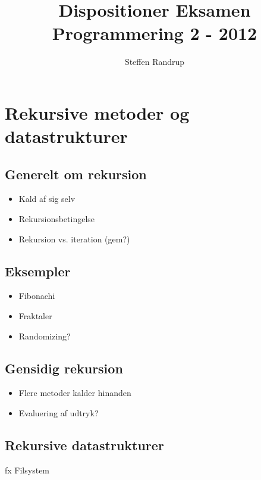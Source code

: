 
\author{Steffen Randrup}
\title{Dispositioner Eksamen Programmering 2 - 2012}

\maketitle
\newpage
\section{Rekursive metoder og datastrukturer} %
\label{sec:rekursive_metoder_og_datastrukturer}
\subsection{Generelt om rekursion} %
\label{sub:generelt_om_rekursion}
\begin{itemize}
    \item Kald af sig selv
    \item Rekursionsbetingelse
    \item Rekursion vs. iteration (gem?)
\end{itemize}

\subsection{Eksempler} %
\label{sub:eksempler}
\begin{itemize}
    \item Fibonachi
    \item Fraktaler
    \item Randomizing?
\end{itemize}

\subsection{Gensidig rekursion} %
\label{sub:gensidig_rekursion}
\begin{itemize}
    \item Flere metoder kalder hinanden
    \item Evaluering af udtryk?
\end{itemize}

\subsection{Rekursive datastrukturer} %
\label{sub:rekursive_datastrukturer}
fx Filsystem
